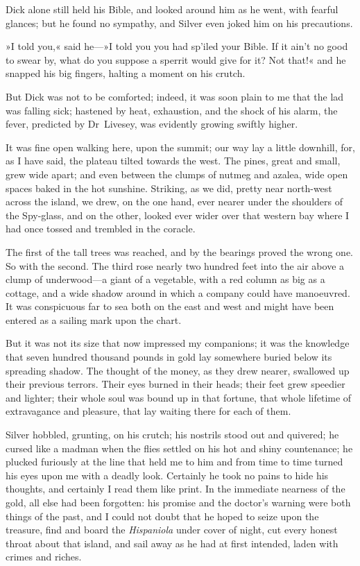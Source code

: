 Dick alone still held his Bible, and looked around him as he went, with fearful glances; but he found no sympathy, and Silver even joked him on his precautions.

»I told you,« said he—»I told you you had sp'iled your Bible. If it ain't no good to swear by, what do you suppose a sperrit would give for it? Not that!« and he snapped his big fingers, halting a moment on his crutch.

But Dick was not to be comforted; indeed, it was soon plain to me that the lad was falling sick; hastened by heat, exhaustion, and the shock of his alarm, the fever, predicted by Dr~Livesey, was evidently growing swiftly higher.

It was fine open walking here, upon the summit; our way lay a little downhill, for, as I have said, the plateau tilted towards the west. The pines, great and small, grew wide apart; and even between the clumps of nutmeg and azalea, wide open spaces baked in the hot sunshine. Striking, as we did, pretty near north-west across the island, we drew, on the one hand, ever nearer under the shoulders of the Spy-glass, and on the other, looked ever wider over that western bay where I had once tossed and trembled in the coracle.

The first of the tall trees was reached, and by the bearings proved the wrong one. So with the second. The third rose nearly two hundred feet into the air above a clump of underwood—a giant of a vegetable, with a red column as big as a cottage, and a wide shadow around in which a company could have manoeuvred. It was conspicuous far to sea both on the east and west and might have been entered as a sailing mark upon the chart.

But it was not its size that now impressed my companions; it was the knowledge that seven hundred thousand pounds in gold lay somewhere buried below its spreading shadow. The thought of the money, as they drew nearer, swallowed up their previous terrors. Their eyes burned in their heads; their feet grew speedier and lighter; their whole soul was bound up in that fortune, that whole lifetime of extravagance and pleasure, that lay waiting there for each of them.

Silver hobbled, grunting, on his crutch; his nostrils stood out and quivered; he cursed like a madman when the flies settled on his hot and shiny countenance; he plucked furiously at the line that held me to him and from time to time turned his eyes upon me with a deadly look. Certainly he took no pains to hide his thoughts, and certainly I read them like print. In the immediate nearness of the gold, all else had been forgotten: his promise and the doctor's warning were both things of the past, and I could not doubt that he hoped to seize upon the treasure, find and board the \textit{Hispaniola} under cover of night, cut every honest throat about that island, and sail away as he had at first intended, laden with crimes and riches.

